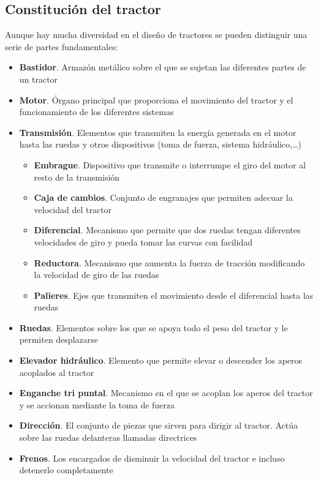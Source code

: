 \documentclass[a4paper,12pt,oneside]{article}
\begin{document}
\subsection{Constitución del tractor}
\label{sec:org0e27f4e}
Aunque hay mucha diversidad en el diseño de tractores se pueden distinguir una
serie de partes fundamentales:
\begin{itemize}
\item \textbf{Bastidor}. Armazón metálico sobre el que se sujetan las diferentes partes de
un tractor
\item \textbf{Motor}. Órgano principal que proporciona el movimiento del tractor y el
funcionamiento de los diferentes sistemas
\item \textbf{Transmisión}. Elementos que transmiten la energía generada en el motor hasta
las ruedas y otros dispositivos (toma de fuerza, sistema hidráulico,\ldots{})
\begin{itemize}
\item \textbf{Embrague}. Dispositivo que transmite o interrumpe el giro del motor al
resto de la transmisión
\item \textbf{Caja de cambios}. Conjunto de engranajes que permiten adecuar la velocidad
del tractor
\item \textbf{Diferencial}. Mecanismo que permite que dos ruedas tengan diferentes
velocidades de giro y pueda tomar las curvas con facilidad
\item \textbf{Reductora}. Mecanismo que aumenta la fuerza de tracción modificando la
velocidad de giro de las ruedas
\item \textbf{Palieres}. Ejes que transmiten el movimiento desde el diferencial hasta las ruedas
\end{itemize}
\item \textbf{Ruedas}. Elementos sobre los que se apoya todo el peso del tractor y le
permiten desplazarse
\item \textbf{Elevador hidráulico}. Elemento que permite elevar o descender los aperos
acoplados al tractor
\item \textbf{Enganche tri puntal}. Mecanismo en el que se acoplan los aperos del tractor
y se accionan mediante la toma de fuerza
\item \textbf{Dirección}. El conjunto de piezas que sirven para dirigir al tractor. Actúa
sobre las ruedas delanteras llamadas directrices
\item \textbf{Frenos}. Los encargados de disminuir la velocidad del tractor e incluso
detenerlo completamente
\end{itemize}
\end{document}
